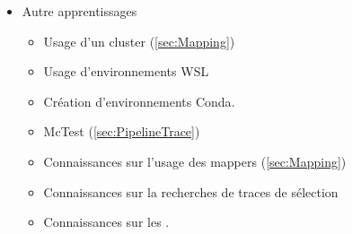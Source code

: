 \begin{itemize}
    \item Autre apprentissages
    \begin{itemize}
        \item Usage d'un \gls{cluster} (\cref{sec:Mapping})
        \item Usage d'environnements \acrshort{WSL}
        \item Création d'environnements \gls{Conda}.
        \item \gls{McTest} (\cref{sec:PipelineTrace})
        \item Connaissances sur l'usage des mappers (\cref{sec:Mapping})
        \item Connaissances sur la recherches de traces de sélection 
        \item Connaissances sur les \bam.

    \end{itemize}
\end{itemize}
